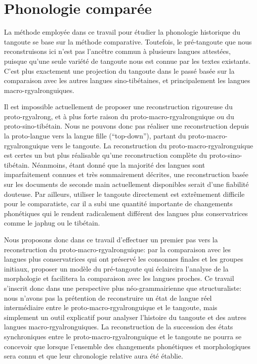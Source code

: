 \documentclass[oldfontcommands,twoside,a4paper,11pt,draft]{memoir}
\begin{document}
\chapter{Phonologie comparée} \label{phono}
 \thispagestyle{empty}
La méthode employée dans ce travail pour étudier la phonologie historique du tangoute se base sur la méthode comparative. Toutefois, le pré-tangoute que nous reconstruisons ici n'est pas l'ancêtre commun à plusieurs langues attestées, puisque qu'une seule variété de tangoute nous est connue par les textes existants. C'est plus exactement une projection du tangoute dans le passé basée sur la comparaison avec les autres langues sino-tibétaines, et principalement les langues macro-rgyalronguiques.

Il est impossible actuellement de proposer une reconstruction rigoureuse du proto-rgyalrong, et à plus forte raison du proto-macro-rgyalronguique ou du proto-sino-tibétain. Nous ne pouvons donc pas réaliser une reconstruction depuis la proto-langue vers la langue fille (``top-down''), partant du proto-macro-rgyalronguique vers le tangoute. La reconstruction du proto-macro-rgyalronguique est certes un but plus réalisable qu'une reconstruction complète du proto-sino-tibétain. Néanmoins, étant donné que la majorité des langues sont imparfaitement connues et très sommairement décrites, une reconstruction basée sur les documents de seconde main actuellement disponibles serait d'une fiabilité douteuse. Par ailleurs, utiliser le tangoute directement est extrêmement difficile pour le comparatiste, car il a subi une quantité importante de changements phonétiques  qui le rendent radicalement différent des langues plus conservatrices comme le japhug ou le tibétain.

Nous proposons donc dans ce travail d'effectuer un premier pas vers la reconstruction du proto-macro-rgyalronguique: par la comparaison avec les langues plus conservatrices qui ont préservé les consonnes finales et les groupes initiaux, proposer un modèle du pré-tangoute qui éclaircira l'analyse de la morphologie et facilitera la comparaison avec les langues proches. Ce travail s'inscrit donc dans une perspective plus néo-grammairienne que structuraliste: nous n'avons pas la prétention de reconstruire un état de langue réel intermédiaire entre le proto-macro-rgyalronguique et le tangoute, mais simplement un outil explicatif pour analyser l'histoire du tangoute et des autres langues macro-rgyalronguiques. La reconstruction de la succession des états synchroniques entre le proto-macro-rgyalronguique et le tangoute ne pourra se concevoir que lorsque l'ensemble des changements phonétiques et morphologiques sera connu et que leur chronologie relative aura été établie. 
\end{document}

